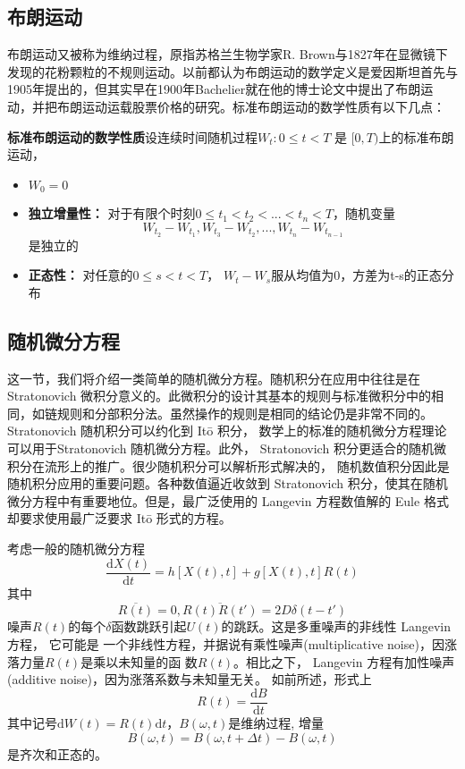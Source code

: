 \documentclass{article}
\begin{document}
\subsection{布朗运动}
布朗运动又被称为维纳过程，原指苏格兰生物学家R. Brown与1827年在显微镜下发现的花粉颗粒的不规则运动。以前都认为布朗运动的数学定义是爱因斯坦首先与1905年提出的，但其实早在1900年Bachelier就在他的博士论文中提出了布朗运动，并把布朗运动运载股票价格的研究。标准布朗运动的数学性质有以下几点：

\textbf{标准布朗运动的数学性质}设连续时间随机过程$W_t: 0 \leq t < T$ 是 $[0,T)$上的标准布朗运动，

\begin{itemize}

 \item $W_0 = 0$

 \item \textbf{独立增量性：} 对于有限个时刻$0 \leq t_1 < t_2 < ... < t_n < T$，随机变量$$W_{t_2}-W_{t_1},W_{t_3}-W_{t_2},...,W_{t_n}-W_{t_{n-1}}$$是独立的

 \item \textbf{正态性：} 对任意的$0 \leq s < t < T$， $W_t-W_s$服从均值为0，方差为t-s的正态分布

\end{itemize}


\subsection{随机微分方程}
这一节，我们将介绍一类简单的随机微分方程。随机积分在应用中往往是在 Stratonovich 微积分意义的。此微积分的设计其基本的规则与标准微积分中的相同，如链规则和分部积分法。虽然操作的规则是相同的结论仍是非常不同的。Stratonovich 随机积分可以约化到 Itō 积分， 数学上的标准的随机微分方程理论可以用于Stratonovich 随机微分方程。此外， Stratonovich 积分更适合的随机微积分在流形上的推广。很少随机积分可以解析形式解决的， 随机数值积分因此是随机积分应用的重要问题。各种数值逼近收敛到 Stratonovich 积分，使其在随机微分方程中有重要地位。但是，最广泛使用的 Langevin
方程数值解的 Eule 格式却要求使用最广泛要求 Itō 形式的方程。

考虑一般的随机微分方程$$\frac{\mathrm{d}X(t)}{\mathrm{d}t}=h[X(t),t]+g[X(t),t]R(t)$$
其中$$\overline{R(t)}=0, \overline{R(t)R(t')}=2D\delta(t-t')$$
噪声$R(t)$的每个$\delta$函数跳跃引起$U(t)$的跳跃。这是多重噪声的非线性 Langevin 方程， 它可能是
一个非线性方程，并据说有乘性噪声(multiplicative noise)，因涨落力量$R(t)$是乘以未知量的函
数$R(t)$。相比之下， Langevin 方程有加性噪声(additive noise)，因为涨落系数与未知量无关。
如前所述，形式上
$$R(t)=\frac{\mathrm{d}B}{\mathrm{d}t}$$
其中记号$\mathrm{d}W(t)=R(t)\mathrm{d}t$，$B(\omega,t)$是维纳过程, 增量$$B(\omega,t)=B(\omega,t+\Delta{t})-B(\omega,t)$$是齐次和正态的。
\end{document}

